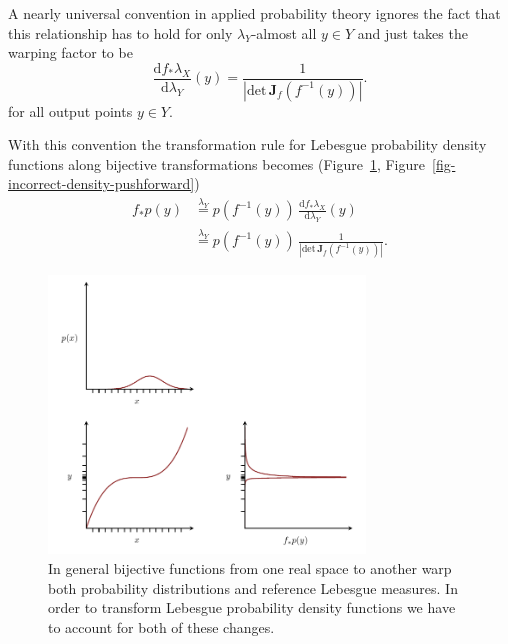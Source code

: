 \documentclass[
  letterpaper,
  DIV=11,
  numbers=noendperiod]{scrartcl}
\begin{document}
A nearly universal convention in applied probability theory ignores the
fact that this relationship has to hold for only \(\lambda_{Y}\)-almost
all \(y \in Y\) and just takes the warping factor to be \[
\frac{ \mathrm{d} f_{*} \lambda_{X} }{ \mathrm{d} \lambda_{Y}}(y)
=
\frac{1}{ | \mathrm{det} \, \mathbf{J}_{f}(f^{-1}(y)) |}.
\] for all output points \(y \in Y\).

With this convention the transformation rule for Lebesgue probability
density functions along bijective transformations becomes
(Figure~\ref{fig-correct-density-pushforward},
Figure~\ref{fig-incorrect-density-pushforward}) \begin{align*}
f_{*} p(y)
&\overset{\lambda_{Y}}{=} p(f^{-1}(y)) \,
\frac{ \mathrm{d} f_{*} \lambda_{X} }{ \mathrm{d} \lambda_{Y}}(y)
\\
&\overset{\lambda_{Y}}{=} p(f^{-1}(y)) \,
\frac{1}{ | \mathrm{det} \, \mathbf{J}_{f}(f^{-1}(y)) | }.
\end{align*}

\begin{figure}

{\centering \includegraphics[width=0.75\textwidth,height=\textheight]{figures/pushforwards_density_functions/1d/correct/correct.pdf}

}

\caption{\label{fig-correct-density-pushforward}In general bijective
functions from one real space to another warp both probability
distributions and reference Lebesgue measures. In order to transform
Lebesgue probability density functions we have to account for both of
these changes.}

\end{figure}
\end{document}
